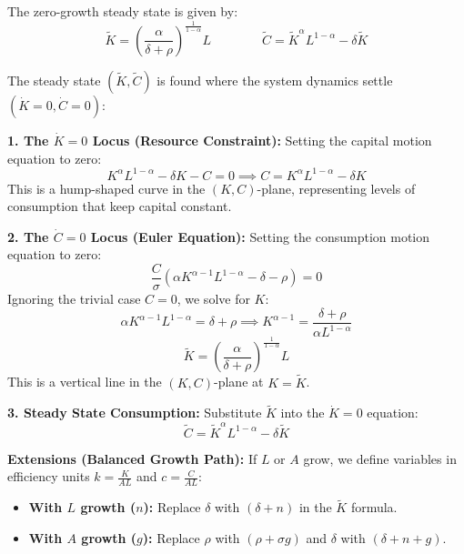 The zero-growth steady state is given by: 
$$\tilde{K} = \left(\frac{\alpha}{\delta + \rho}\right)^{\frac{1}{1-\alpha}} L \quad\quad\quad\quad \tilde{C} = \tilde{K}^{\alpha} L^{1-\alpha} - \delta \tilde{K}$$
\begin{tcolorbox}[
    colback=red!5!white, %
    colframe=red!40!white, %
    title=Derivation of the steady state, %
    fonttitle=\bfseries %
    ]
The steady state $(\tilde{K}, \tilde{C})$ is found where the system dynamics settle $(\dot{K}=0, \dot{C}=0)$:

\textbf{1. The $\dot{K}=0$ Locus (Resource Constraint):}
Setting the capital motion equation to zero:
$$K^{\alpha} L^{1-\alpha} - \delta K - C = 0 \implies C = K^{\alpha} L^{1-\alpha} - \delta K$$
This is a hump-shaped curve in the $(K,C)$-plane, representing levels of consumption that keep capital constant.

\textbf{2. The $\dot{C}=0$ Locus (Euler Equation):}
Setting the consumption motion equation to zero:
$$\frac{C}{\sigma}(\alpha K^{\alpha - 1} L^{1-\alpha} - \delta - \rho) = 0$$
Ignoring the trivial case $C=0$, we solve for $K$:
$$\alpha K^{\alpha - 1} L^{1-\alpha} = \delta + \rho \implies K^{\alpha - 1} = \frac{\delta + \rho}{\alpha L^{1-\alpha}}$$
$$\tilde{K} = \left( \frac{\alpha}{\delta + \rho} \right)^{\frac{1}{1-\alpha}} L$$
This is a vertical line in the $(K,C)$-plane at $K = \tilde{K}$.

\textbf{3. Steady State Consumption:}
Substitute $\tilde{K}$ into the $\dot{K}=0$ equation:
$$\tilde{C} = \tilde{K}^{\alpha} L^{1-\alpha} - \delta \tilde{K}$$

\textbf{Extensions (Balanced Growth Path):}
If $L$ or $A$ grow, we define variables in efficiency units $k = \frac{K}{AL}$ and $c = \frac{C}{AL}$:
\begin{itemize}
    \item \textbf{With $L$ growth ($n$):} Replace $\delta$ with $(\delta + n)$ in the $\tilde{K}$ formula.
    \item \textbf{With $A$ growth ($g$):} Replace $\rho$ with $(\rho + \sigma g)$ and $\delta$ with $(\delta + n + g)$.
\end{itemize}
\end{tcolorbox}
